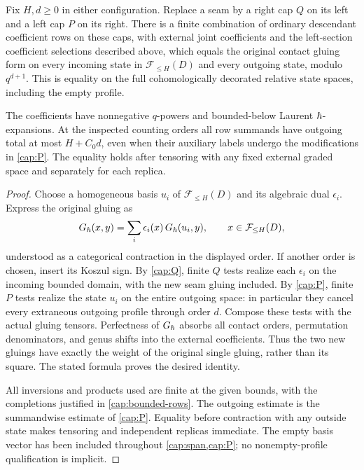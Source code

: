 \begin{proposition}
\label{cap:identity}
Fix $H,d\geq0$ in either configuration.  Replace a seam by a right
cap $Q$ on its left and a left cap $P$ on its right.  There is a
finite combination of ordinary descendant coefficient rows on
these caps, with external joint coefficients and the left-section
coefficient selections described above, which equals the original
contact gluing form on every incoming state in
$\mathcal F_{\leq H}(D)$ and every outgoing state, modulo
$q^{d+1}$.  This is equality on the full cohomologically decorated
relative state spaces, including the empty profile.

The coefficients have nonnegative $q$-powers and bounded-below
Laurent $\hbar$-expansions.  At the inspected counting orders all row
summands have outgoing total at most $H+C_0d$, even when their
auxiliary labels undergo the modifications in \cref{cap:P}.
The equality holds after tensoring with any fixed external graded
space and separately for each replica.
\end{proposition}
\begin{proof}
Choose a homogeneous basis $u_i$ of $\mathcal F_{\leq H}(D)$ and
its algebraic dual $\epsilon_i$.  Express the original gluing as
\[
         G_{\hbar}(x,y)
            =\sum_i \epsilon_i(x)\,G_{\hbar}(u_i,y),
         \qquad x\in\mathcal F_{\leq H}(D),
\]
understood as a categorical contraction in the displayed order.
If another order is chosen, insert its Koszul sign.
By \cref{cap:Q}, finite $Q$ tests realize each $\epsilon_i$ on
the incoming bounded domain, with the new seam gluing included.
By \cref{cap:P}, finite $P$ tests realize the state $u_i$ on the
entire outgoing space: in particular they cancel every extraneous
outgoing profile through order $d$.  Compose these tests with the
actual gluing tensors.  Perfectness of $G_{\hbar}$ absorbs all
contact orders, permutation denominators, and genus shifts into
the external coefficients.  Thus the two new gluings have exactly
the weight of the original single gluing, rather than its square.
The stated formula proves the desired identity.

All inversions and products used are finite at the given bounds,
with the completions justified in \cref{cap:bounded-rows}.
The outgoing estimate is the summandwise estimate of
\cref{cap:P}.  Equality before contraction with any outside state
makes tensoring and independent replicas immediate.  The empty
basis vector has been included throughout \cref{cap:span,cap:P};
no nonempty-profile qualification is implicit.
\end{proof}

